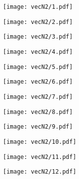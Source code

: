 \documentclass{article}
\begin{document}
\begin{figure}[H]
\centering
\begin{subfigure}{.49\textwidth}
\texttt{[image: vecN2/1.pdf]}
\end{subfigure}
\begin{subfigure}{.49\textwidth}
\texttt{[image: vecN2/2.pdf]}
\end{subfigure}
\end{figure}
\begin{figure}[H]
\centering
\begin{subfigure}{.49\textwidth}
\texttt{[image: vecN2/3.pdf]}
\end{subfigure}
\begin{subfigure}{.49\textwidth}
\texttt{[image: vecN2/4.pdf]}
\end{subfigure}
\end{figure}
\begin{figure}[H]
\centering
\begin{subfigure}{.49\textwidth}
\texttt{[image: vecN2/5.pdf]}
\end{subfigure}
\begin{subfigure}{.49\textwidth}
\texttt{[image: vecN2/6.pdf]}
\end{subfigure}
\end{figure}
\begin{figure}[H]
\centering
\begin{subfigure}{.49\textwidth}
\texttt{[image: vecN2/7.pdf]}
\end{subfigure}
\begin{subfigure}{.49\textwidth}
\texttt{[image: vecN2/8.pdf]}
\end{subfigure}
\end{figure}
\begin{figure}[H]
\centering
\begin{subfigure}{.49\textwidth}
\texttt{[image: vecN2/9.pdf]}
\end{subfigure}
\begin{subfigure}{.49\textwidth}
\texttt{[image: vecN2/10.pdf]}
\end{subfigure}
\end{figure}
\begin{figure}[H]
\centering
\begin{subfigure}{.49\textwidth}
\texttt{[image: vecN2/11.pdf]}
\end{subfigure}
\begin{subfigure}{.49\textwidth}
\texttt{[image: vecN2/12.pdf]}
\end{subfigure}
\end{figure}
\end{document}
